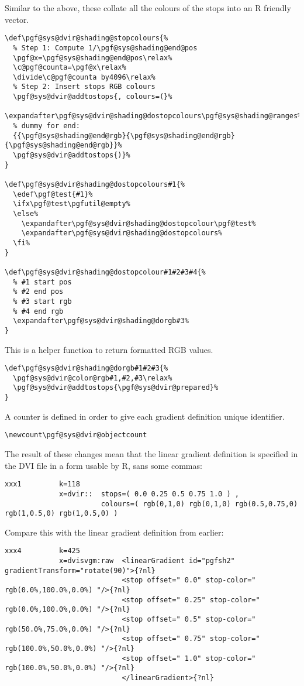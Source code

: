 \documentclass[]{article}
\begin{document}
Similar to the above, these collate all the colours of the stops into an
R friendly vector.

\begin{verbatim}
\def\pgf@sys@dvir@shading@stopcolours{%
  % Step 1: Compute 1/\pgf@sys@shading@end@pos
  \pgf@x=\pgf@sys@shading@end@pos\relax%
  \c@pgf@counta=\pgf@x\relax%
  \divide\c@pgf@counta by4096\relax%
  % Step 2: Insert stops RGB colours
  \pgf@sys@dvir@addtostops{, colours=(}%
  \expandafter\pgf@sys@dvir@shading@dostopcolours\pgf@sys@shading@ranges%
  % dummy for end:
  {{\pgf@sys@shading@end@rgb}{\pgf@sys@shading@end@rgb}{\pgf@sys@shading@end@rgb}}%
  \pgf@sys@dvir@addtostops{)}%
}

\def\pgf@sys@dvir@shading@dostopcolours#1{%
  \edef\pgf@test{#1}%
  \ifx\pgf@test\pgfutil@empty%
  \else%
    \expandafter\pgf@sys@dvir@shading@dostopcolour\pgf@test%
    \expandafter\pgf@sys@dvir@shading@dostopcolours%
  \fi%
}

\def\pgf@sys@dvir@shading@dostopcolour#1#2#3#4{%
  % #1 start pos
  % #2 end pos
  % #3 start rgb
  % #4 end rgb
  \expandafter\pgf@sys@dvir@shading@dorgb#3%
}
\end{verbatim}

This is a helper function to return formatted RGB values.

\begin{verbatim}
\def\pgf@sys@dvir@shading@dorgb#1#2#3{%
  \pgf@sys@dvir@color@rgb#1,#2,#3\relax%
  \pgf@sys@dvir@addtostops{\pgf@sys@dvir@prepared}%
}
\end{verbatim}

A counter is defined in order to give each gradient definition unique
identifier.

\begin{verbatim}
\newcount\pgf@sys@dvir@objectcount
\end{verbatim}

The result of these changes mean that the linear gradient definition is
specified in the DVI file in a form usable by R, sans some commas:

\begin{verbatim}
xxx1         k=118
             x=dvir::  stops=( 0.0 0.25 0.5 0.75 1.0 ) , 
                       colours=( rgb(0,1,0) rgb(0,1,0) rgb(0.5,0.75,0) rgb(1,0.5,0) rgb(1,0.5,0) )
\end{verbatim}

Compare this with the linear gradient definition from earlier:

\begin{verbatim}
xxx4         k=425
             x=dvisvgm:raw  <linearGradient id="pgfsh2" gradientTransform="rotate(90)">{?nl} 
                            <stop offset=" 0.0" stop-color=" rgb(0.0%,100.0%,0.0%) "/>{?nl} 
                            <stop offset=" 0.25" stop-color=" rgb(0.0%,100.0%,0.0%) "/>{?nl} 
                            <stop offset=" 0.5" stop-color=" rgb(50.0%,75.0%,0.0%) "/>{?nl} 
                            <stop offset=" 0.75" stop-color=" rgb(100.0%,50.0%,0.0%) "/>{?nl} 
                            <stop offset=" 1.0" stop-color=" rgb(100.0%,50.0%,0.0%) "/>{?nl} 
                            </linearGradient>{?nl} 
\end{verbatim}
\end{document}
